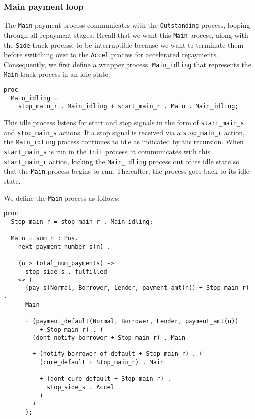 \documentclass{article}
\begin{document}

\subsubsection{Main payment loop}

The \texttt{Main} payment process communicates with the \texttt{Outstanding}
process, looping through all repayment stages.
Recall that we want this \texttt{Main} process, along with the \texttt{Side}
track process, to be interruptible because we want to terminate them
before switching over to the \texttt{Accel} process for accelerated repayments.
Consequently, we first define a wrapper process, \texttt{Main\_idling} that
represents the \texttt{Main} track process in an idle state:

\begin{lstlisting}
proc
  Main_idling =
    stop_main_r . Main_idling + start_main_r . Main . Main_idling;
\end{lstlisting}

This idle process listens for start and stop signals in the form of
\texttt{start\_main\_s} and \texttt{stop\_main\_s} actions.
If a stop signal is received via a \texttt{stop\_main\_r} action,
the \texttt{Main\_idling} process continues to idle as indicated by the
recursion.
When \texttt{start\_main\_s} is run in the \texttt{Init} process, it
communicates with this \texttt{start\_main\_r} action, kicking the
\texttt{Main\_idling} process out of its idle state so that the
\texttt{Main} process begins to run.
Thereafter, the process goes back to its idle state.

We define the \texttt{Main} process as follows:

\begin{lstlisting}
proc
  Stop_main_r = stop_main_r . Main_idling;

  Main = sum n : Pos.
    next_payment_number_s(n) .

    (n > total_num_payments) -> 
      stop_side_s . fulfilled
    <> (
      (pay_s(Normal, Borrower, Lender, payment_amt(n)) + Stop_main_r) .
      Main

      + (payment_default(Normal, Borrower, Lender, payment_amt(n))
          + Stop_main_r) . (
        (dont_notify_borrower + Stop_main_r) . Main

        + (notify_borrower_of_default + Stop_main_r) . (
          (cure_default + Stop_main_r) . Main

          + (dont_cure_default + Stop_main_r) .
            stop_side_s . Accel
          )
        )
      );
\end{lstlisting}
\end{document}
